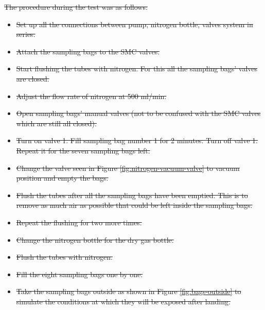 \documentclass[a4paper,12pt,twoside]{article}
\providecommand{\DIFdeltex}[1]{{\protect\color{red}\sout{#1}}}                      %
\providecommand{\DIFdel}[1]{\texorpdfstring{\DIFdeltex{#1}}{}} %
\begin{document}
\DIFdel{The procedure during the test was as follows: 
}%
\begin{itemize}%
\item%
\DIFdel{Set up all the connections between pump, nitrogen bottle, valves system in series. 
    }%
\item%
\DIFdel{Attach the sampling bags to the SMC valves. 
    }%
\item%
\DIFdel{Start flushing the tubes with nitrogen. For this all the sampling bags' valves are closed. 
    }%
\item%
\DIFdel{Adjust the flow rate of nitrogen at 500 ml/min. 
    }%
\item%
\DIFdel{Open sampling bags' manual valves (not to be confused with the SMC valves which are still all closed).
    }%
\item%
\DIFdel{Turn on valve 1. Fill sampling bag number 1 for 2 minutes. Turn off valve 1. Repeat it for the seven sampling bags left.  
    }%
\item%
\DIFdel{Change the valve seen in Figure \ref{fig:nitrogen-vacuum-valve} to vacuum position and empty the bags.
    }%
\item%
\DIFdel{Flush the tubes after all the sampling bags have been emptied. This is to remove as much air as possible that could be left inside the sampling bags.
    }%
\item%
\DIFdel{Repeat the flushing for two more times. 
    }%
\item%
\DIFdel{Change the nitrogen bottle for the dry gas bottle. 
    }%
\item%
\DIFdel{Flush the tubes with nitrogen. 
    }%
\item%
\DIFdel{Fill the eight sampling bags one by one. 
    }%
\item%
\DIFdel{Take the sampling bags outside as shown in Figure \ref{fig:bags-outside} to simulate the conditions at which they will be exposed after landing. 
}
\end{itemize}%
\end{document}
